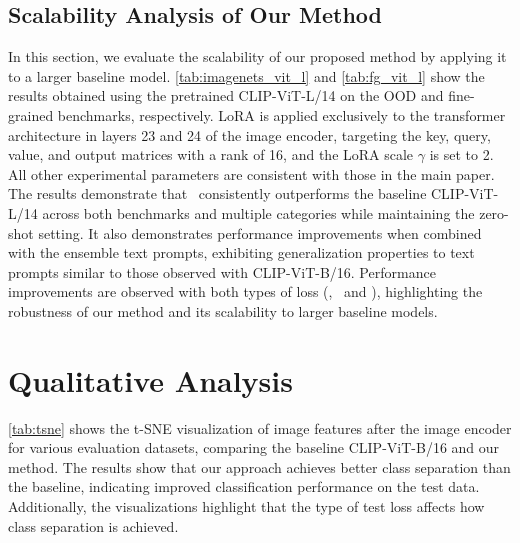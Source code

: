 \subsection{Scalability Analysis of Our Method}
In this section, we evaluate the scalability of our proposed method by applying it to a larger baseline model.
\cref{tab:imagenets_vit_l} and \cref{tab:fg_vit_l} show the results obtained using the pretrained CLIP-ViT-L/14 on the OOD and fine-grained benchmarks, respectively.
LoRA is applied exclusively to the transformer architecture in layers 23 and 24 of the image encoder, targeting the key, query, value, and output matrices with a rank of 16, and the LoRA scale $\gamma$ is set to 2.
All other experimental parameters are consistent with those in the main paper. 
The results demonstrate that \name\ consistently outperforms the baseline CLIP-ViT-L/14 across both benchmarks and multiple categories while maintaining the zero-shot setting.
It also demonstrates performance improvements when combined with the ensemble text prompts, exhibiting generalization properties to text prompts similar to those observed with CLIP-ViT-B/16.
Performance improvements are observed with both types of loss (\ie, \namemem\ and \namemae), highlighting the robustness of our method and its scalability to larger baseline models.


\section{Qualitative Analysis}
\cref{tab:tsne} shows the t-SNE visualization of image features after the image encoder for various evaluation datasets, comparing the baseline CLIP-ViT-B/16 and our method.
The results show that our approach achieves better class separation than the baseline, indicating improved classification performance on the test data.
Additionally, the visualizations highlight that the type of test loss affects how class separation is achieved.

